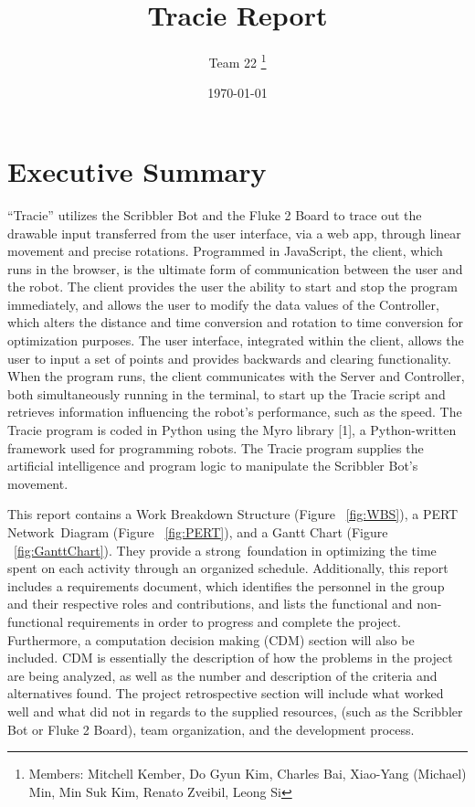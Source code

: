 \documentclass[11pt, letterpaper]{article}
\title{Tracie Report}
\author{Team 22 \thanks{Members: Mitchell Kember, Do Gyun Kim, Charles Bai, Xiao-Yang (Michael) Min, Min Suk Kim, Renato Zveibil, Leong Si}}
\date{\today}
\begin{document}
	\begin{titlepage}
		\maketitle
		\thispagestyle{empty}	%
	\end{titlepage}

	\setcounter{page}{2}	%

	\tableofcontents	%

	\section{Executive Summary}

	“Tracie” utilizes the Scribbler Bot and the Fluke 2 Board to trace out the drawable input transferred from the user interface, via a web app, through linear movement and precise rotations. Programmed in JavaScript, the client, which runs in the browser, is the ultimate form of communication between the user and the robot. The client provides the user the ability to start and stop the program immediately, and allows the user to modify the data values of the Controller, which alters the distance and time conversion and rotation to time conversion for optimization purposes. The user interface, integrated within the client, allows the user to input a set of points and provides backwards and clearing functionality. 
	When the program runs, the client communicates with the Server and Controller, both simultaneously running in the terminal, to start up the Tracie script and retrieves information influencing the robot’s performance, such as the speed. The Tracie program is coded in Python using the Myro library [1], a Python-written framework used for programming robots. The Tracie program supplies the artificial intelligence and program logic to manipulate the Scribbler Bot’s movement.\par
	This report contains a Work Breakdown Structure (Figure ~\ref{fig:WBS}), a PERT Network\ Diagram (Figure ~\ref{fig:PERT}), and a Gantt Chart (Figure ~\ref{fig:GanttChart}). They provide a strong\ foundation in optimizing the time spent on each activity through an organized schedule. Additionally, this report includes a requirements document, which identifies the personnel in the group and their respective roles and contributions, and lists the functional and non-functional requirements in order to progress and complete the project. Furthermore, a computation decision making (CDM) section will also be included. CDM is essentially the description of how the problems in the project are being analyzed, as well as the number and description of the criteria and alternatives found. The project retrospective section will include what worked well and what did not in regards to the supplied resources, (such as the Scribbler Bot or Fluke 2 Board), team organization, and the development process.
\end{document}
